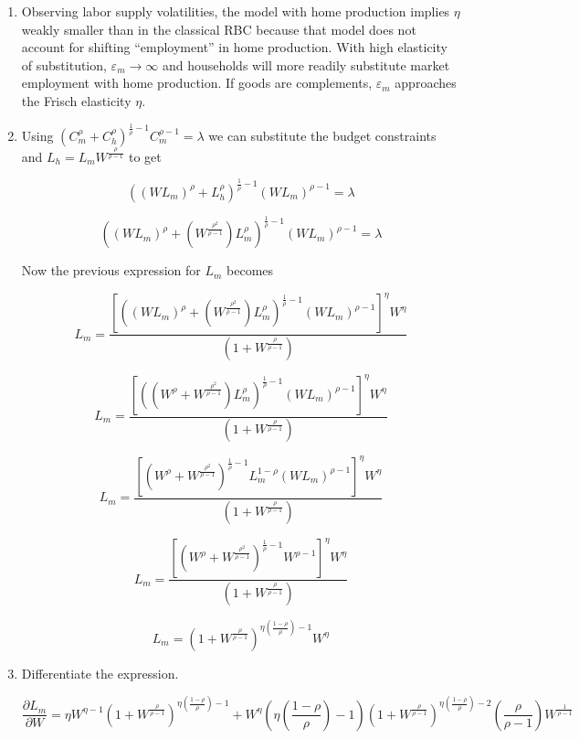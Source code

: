 \documentclass[11pt]{article}
\begin{document}
\begin{enumerate}
        \item Observing labor supply volatilities, the model with home production implies $\eta$ weakly smaller than in the classical RBC because that model does not account for shifting ``employment'' in home production. With high elasticity of substitution, $\varepsilon_m \to \infty$ and households will more readily substitute market employment with home production. If goods are complements, $\varepsilon_m$ approaches the Frisch elasticity $\eta$.

        \item Using $\left( C_m^\rho + C_h^\rho \right)^{\frac{1}{\rho} -1}  C_m^{\rho-1} = \lambda$ we can substitute the budget constraints and $L_h = L_m W^{\frac{\rho}{\rho-1}}$ to get

            $$ ((W L_m)^{\rho} + L_h^{\rho})^{\frac{1}{\rho} -1} (W L_m)^{\rho-1} = \lambda $$

        	$$ ((W L_m)^{\rho} + ( W^{\frac{\rho^2}{\rho-1}}) L_m^{\rho})^{\frac{1}{\rho} -1} (W L_m)^{\rho-1} = \lambda $$

        Now the previous expression for $L_m$ becomes

        	$$ L_m = \frac{ \left[((W L_m)^{\rho} + ( W^{\frac{\rho^2}{\rho-1}}) L_m^{\rho})^{\frac{1}{\rho} -1} (W L_m)^{\rho-1}\right]^{\eta} W^{\eta}}{(1 + W^{\frac{\rho}{\rho-1}})} $$

        	$$ L_m = \frac{ \left[((W^{\rho} + W^{\frac{\rho^2}{\rho-1}}) L_m^{\rho})^{\frac{1}{\rho} -1} (W L_m)^{\rho-1}\right]^{\eta} W^{\eta}}{(1 + W^{\frac{\rho}{\rho-1}})} $$

        	$$ L_m = \frac{ \left[(W^{\rho} + W^{\frac{\rho^2}{\rho-1}})^{\frac{1}{\rho} -1} L_m^{1-\rho} (W L_m)^{\rho-1}\right]^{\eta} W^{\eta}}{(1 + W^{\frac{\rho}{\rho-1}})} $$

        	$$ L_m = \frac{ \left[(W^{\rho} + W^{\frac{\rho^2}{\rho-1}})^{\frac{1}{\rho} -1}  W ^{\rho-1}\right]^{\eta} W^{\eta}}{(1 + W^{\frac{\rho}{\rho-1}})} $$

        	$$ L_m = \left( 1 + W^{\frac{\rho}{\rho-1}} \right)^{\eta \left( \frac{1-\rho}{\rho} \right) -1} W^\eta $$

        \item Differentiate the expression.

        	\begin{equation*}
        	\frac{\partial L_m}{\partial W} = \eta W^{\eta -1 } \left( 1 + W^{\frac{\rho}{\rho-1}} \right)^{\eta \left( \frac{1-\rho}{\rho} \right) -1} + W^\eta \left( \eta \left( \frac{1-\rho}{\rho} \right) -1  \right)  \left( 1 + W^{\frac{\rho}{\rho-1}} \right)^{\eta \left( \frac{1-\rho}{\rho} \right) -2} \left( \frac{\rho}{\rho-1} \right) W^{\frac{1}{\rho-1}}
        	\end{equation*}


\end{enumerate}
\end{document}
